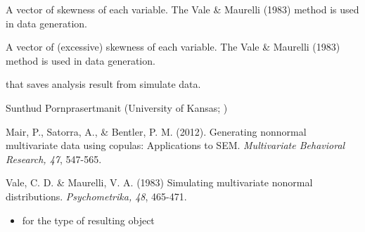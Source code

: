 \documentclass[a4paper]{book}
\begin{document}
\begin{Arguments}
\begin{ldescription}
\item[\code{skewness}] 
A vector of skewness of each variable. The Vale \& Maurelli (1983) method is used in data generation.

\item[\code{kurtosis}] 
A vector of (excessive) skewness of each variable. The Vale \& Maurelli (1983) method is used in data generation.

\end{ldescription}
\end{Arguments}
%
\begin{Value}
 that saves analysis result from simulate data.
\end{Value}
%
\begin{Author}\relax
Sunthud Pornprasertmanit (University of Kansas; )
\end{Author}
%
\begin{References}\relax
Mair, P., Satorra, A., \& Bentler, P. M. (2012). Generating nonnormal multivariate data using copulas: Applications to SEM. \emph{Multivariate Behavioral Research, 47}, 547-565.

Vale, C. D. \& Maurelli, V. A. (1983) Simulating multivariate nonormal distributions. \emph{Psychometrika, 48}, 465-471.
\end{References}
%
\begin{SeeAlso}\relax
\begin{itemize}

\item {} for the type of resulting object

\end{itemize}

\end{SeeAlso}
%
\end{document}
